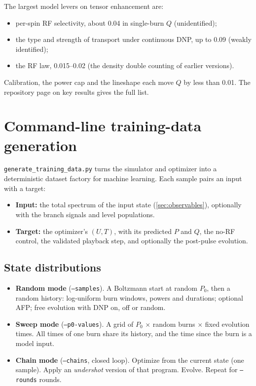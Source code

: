 \documentclass[11pt]{article}
\newcommand{\code}[1]{\texttt{#1}}
\begin{document}
\noindent The largest model levers on tensor enhancement are:
\begin{itemize}
\item per-spin RF selectivity, about 0.04 in single-burn \(Q\) (unidentified);
\item the type and strength of transport under continuous DNP, up to 0.09 (weakly identified);
\item the RF law, 0.015--0.02 (the density double counting of earlier versions).
\end{itemize}
Calibration, the power cap and the lineshape each move \(Q\) by less than 0.01. The repository
page on key results gives the full list.

\section{Command-line training-data generation}
\label{sec:datagen}

\code{generate\_training\_data.py} turns the simulator and optimizer into a deterministic dataset
factory for machine learning. Each sample pairs an input with a target:
\begin{itemize}
\item \textbf{Input:} the total spectrum of the input state (\cref{sec:observables}), optionally
with the branch signals and level populations.
\item \textbf{Target:} the optimizer's \((U,T)\), with its predicted \(P\) and \(Q\), the no-RF
control, the validated playback step, and optionally the post-pulse evolution.
\end{itemize}

\subsection{State distributions}

\begin{itemize}
  \item \textbf{Random mode} (\code{--samples}). A Boltzmann start at random \(P_0\), then a random
  history: log-uniform burn windows, powers and durations; optional AFP; free evolution with DNP
  on, off or random.
  \item \textbf{Sweep mode} (\code{--p0-values}). A grid of \(P_0\) \(\times\) random burns
  \(\times\) fixed evolution times. All times of one burn share its history, and the time since
  the burn is a model input.
  \item \textbf{Chain mode} (\code{--chains}, closed loop). Optimize from the current state (one
  sample). Apply an \emph{undershot} version of that program. Evolve. Repeat for \code{--rounds}
  rounds.
\end{itemize}
\end{document}
